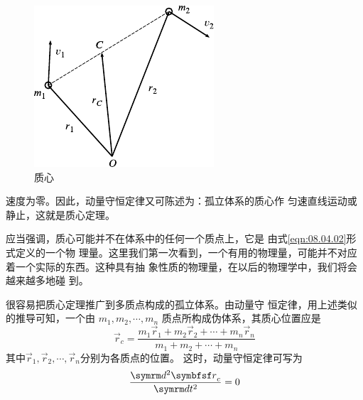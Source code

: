 \begin{figure}
  \centering
  \includegraphics{figure/fig08.09}
  \caption{质心}
  \label{fig:08.09}
\end{figure}
\noindent 速度为零。因此，动量守恒定律又可陈述为：孤立体系的质心作
匀速直线运动或静止，这就是质心定理。

应当强调，质心可能并不在体系中的任何一个质点上，它是
由式\eqref{eqn:08.04.02}形式定义的一个物
理量。这里我们第一次看到，一个有用的物理量，可能并不对应
着一个实际的东西。这种具有抽
象性质的物理量，在以后的物理学中，我们将会越来越多地碰
到。

很容易把质心定理推广到多质点构成的孤立体系。由动量守
恒定律，用上述类似的推导可知，一个由
$ m _ { 1 } , m _ { 2 } , \cdots , m _ { n } $
质点所构成伪体系，其质心位置应是
\begin{equation}\label{eqn:08.04.04}
  \vec { r } _ { c } = \frac { m _ { 1 } \vec { r } _ { 1 } + m _ { 2 } \vec { r } _ { 2 } + \cdots + m _ { n } \vec { r } _ { n } } { m _ { 1 } + m _ { 2 } + \cdots + m _ { n } }
\end{equation}
其中$ \vec { r } _ { 1 } , \vec { r } _ { 2 } , \cdots , \vec { r } _ { n }$分别为各质点的位置。
这时，动量守恒定律可写为\vspace{-0.4em}
\begin{equation}\label{eqn:08.04.05}
  \frac { \dif ^ { 2 } \vec { r } _ { c } } { \dif t ^ { 2 } } = 0
\end{equation}

